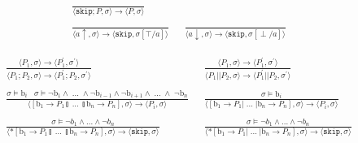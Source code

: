 \documentclass[times,10pt]{article}
\begin{document}
\begin{align*}
\frac{}{\langle \mathtt{skip}; P, \sigma \rangle \rightarrow \langle P, \sigma \rangle } & \\ \\
\frac{}{\langle a \uparrow , \sigma\rangle \rightarrow \langle \mathtt{skip}, \sigma[\top/a]\rangle } &\;\; 
\frac{}{\langle a \downarrow , \sigma\rangle \rightarrow \langle \mathtt{skip}, \sigma[\perp/a]\rangle }
\end{align*}

\begin{align*}
\frac{\langle P_1, \sigma\rangle \rightarrow \langle P_1^\prime, \sigma^\prime\rangle }{\langle P_1; P_2, \sigma\rangle \rightarrow \langle P_1^\prime; P_2, \sigma^\prime\rangle} &
\;\; \frac{\langle P_1, \sigma\rangle \rightarrow \langle P_1^\prime, \sigma^\prime\rangle}{\langle P_1 || P_2, \sigma\rangle \rightarrow \langle P_1^\prime || P_2, \sigma^\prime\rangle} \\ \\
\frac{\sigma \models \textrm{b}_i \;\;\; \sigma \models \lnot \mathrm{b}_1 \wedge \; ... \; \wedge \lnot \mathrm{b}_{i-1} \wedge \lnot \mathrm{b}_{i+1} \wedge \; ... \; \wedge \; \lnot\mathrm{b}_n } {\langle [ \mathrm{b}_1 \rightarrow P_1  \talloblong \; ... \; \talloblong \mathrm{b}_n \rightarrow P_n ] , \sigma \rangle \rightarrow \langle P_i , \sigma\rangle  } &\;\;
 \frac{\sigma \models \textrm{b}_i} {\langle [ \mathrm{b}_1 \rightarrow P_1  | \; ... \; | \mathrm{b}_n \rightarrow P_n ] , \sigma \rangle \rightarrow \langle P_i , \sigma\rangle  } \\ \\
\frac{\sigma \models \lnot b_1 \wedge ... \wedge \lnot b_n}{\langle *[ \mathrm{b}_1 \rightarrow P_1  \talloblong \; ... \; \talloblong \mathrm{b}_n \rightarrow P_n ] , \sigma \rangle \rightarrow \langle \mathtt{skip} , \sigma\rangle } &\;\; 
\frac{\sigma \models \lnot b_1 \wedge ... \wedge \lnot b_n}{\langle *[ \mathrm{b}_1 \rightarrow P_1  | \; ... \; | \mathrm{b}_n \rightarrow P_n ] , \sigma \rangle \rightarrow \langle \mathtt{skip} , \sigma \rangle } 
\end{align*}
\end{document}

